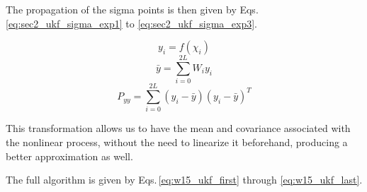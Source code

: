 \documentclass[10pt,twocolumn]{IEEEtran}
\begin{document}
The propagation of the sigma points is then given by Eqs.\,\eqref{eq:sec2_ukf_sigma_exp1} to \eqref{eq:sec2_ukf_sigma_exp3}.

\begin{equation}
    \label{eq:sec2_ukf_sigma_exp1}
    y_i=f(\chi_i)
\end{equation}
\begin{equation}
    \label{eq:sec2_ukf_sigma_exp2}
    \bar{y} = \sum_{i=0}^{2L} W_i y_i
\end{equation}
\begin{equation}
    \label{eq:sec2_ukf_sigma_exp3}
    P_{yy} = \sum_{i=0}^{2L} \left( y_i - \bar{y} \right) \left( y_i - \bar{y} \right) ^T
\end{equation}

This transformation allows us to have the mean and covariance associated with the nonlinear process, without the need to linearize it beforehand, producing a better approximation as well. 

The full algorithm is given by Eqs.\,\eqref{eq:w15_ukf_first} through \eqref{eq:w15_ukf_last}.
\end{document}
